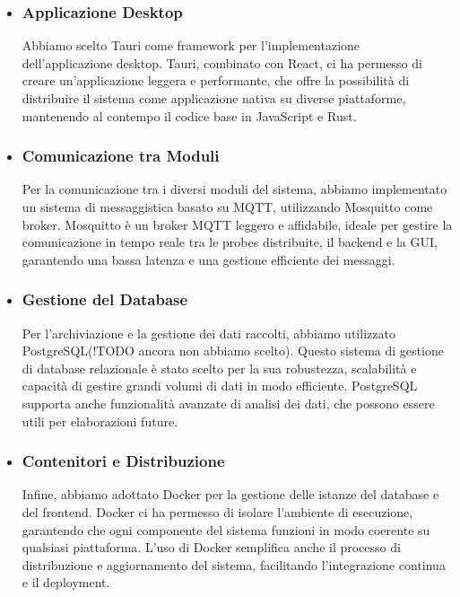\documentclass[target=bach,aauheader=,style=]{thud}
\begin{document}
\begin{itemize}
\item \subsubsection{Applicazione Desktop}
  Abbiamo scelto Tauri come framework per l'implementazione dell'applicazione desktop. Tauri, combinato con React, ci ha permesso di creare un'applicazione leggera e performante, che offre la possibilità di distribuire il sistema come applicazione nativa su diverse piattaforme, mantenendo al contempo il codice base in JavaScript e Rust.

\item \subsubsection{Comunicazione tra Moduli}
  Per la comunicazione tra i diversi moduli del sistema, abbiamo implementato un sistema di messaggistica basato su MQTT, utilizzando Mosquitto come broker. Mosquitto è un broker MQTT leggero e affidabile, ideale per gestire la comunicazione in tempo reale tra le probes distribuite, il backend e la GUI, garantendo una bassa latenza e una gestione efficiente dei messaggi.

\item \subsubsection{Gestione del Database}
  Per l'archiviazione e la gestione dei dati raccolti, abbiamo utilizzato PostgreSQL(!TODO ancora non abbiamo scelto). Questo sistema di gestione di database relazionale è stato scelto per la sua robustezza, scalabilità e capacità di gestire grandi volumi di dati in modo efficiente. PostgreSQL supporta anche funzionalità avanzate di analisi dei dati, che possono essere utili per elaborazioni future.

\item \subsubsection{Contenitori e Distribuzione}
  Infine, abbiamo adottato Docker per la gestione delle istanze del database e del frontend. Docker ci ha permesso di isolare l'ambiente di esecuzione, garantendo che ogni componente del sistema funzioni in modo coerente su qualsiasi piattaforma. L'uso di Docker semplifica anche il processo di distribuzione e aggiornamento del sistema, facilitando l'integrazione continua e il deployment.

\end{itemize}
\end{document}
